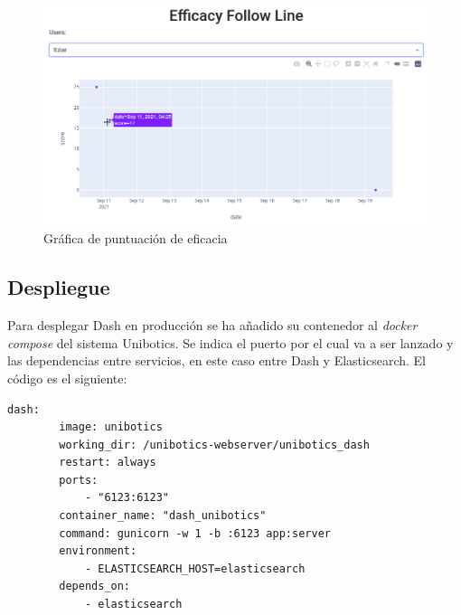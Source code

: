 \begin{figure}[H]
    \centering
    \includegraphics[width=17cm, keepaspectratio]{img/score_efficacy.png}
    \caption{Gráfica de puntuación de eficacia}
    \label{fig:score_efficacy}
\end{figure}
\subsection{Despliegue}
Para desplegar Dash en producción se ha añadido su contenedor al \textit{docker compose} del sistema Unibotics. Se indica el puerto por el cual va a ser lanzado y las dependencias entre servicios, en este caso entre Dash y Elasticsearch. El código es el siguiente:\\


\begin{lstlisting}
dash:
        image: unibotics
        working_dir: /unibotics-webserver/unibotics_dash
        restart: always
        ports:
            - "6123:6123"
        container_name: "dash_unibotics"
        command: gunicorn -w 1 -b :6123 app:server
        environment:
            - ELASTICSEARCH_HOST=elasticsearch
        depends_on:
            - elasticsearch
\end{lstlisting} 
